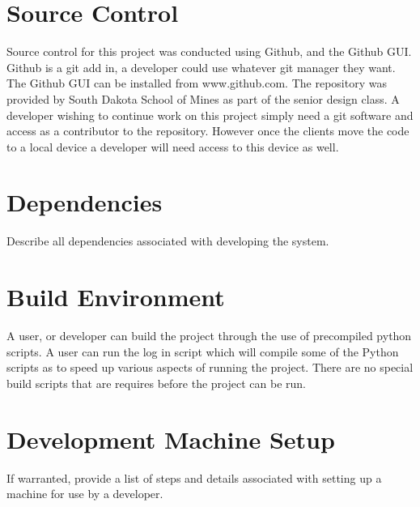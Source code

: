 \section{Source  Control}
Source control for this project was conducted using Github, and the Github GUI. Github is a git add in, a developer  
could use whatever git manager they want. The Github GUI can be installed from www.github.com. The repository was provided by South Dakota School of Mines as part of the senior design class. A developer wishing to continue work on this project simply need a git software and access as a contributor to the repository. However once the clients move the code to a local device a developer will need access to this device as well.
 
\section{Dependencies}
Describe all dependencies associated with developing the system. 

\section{Build  Environment}
A user, or developer can build the project through the use of precompiled python scripts. A user can run the log in script which will compile some of the Python scripts as to speed up various aspects of running the project. There are no special build scripts that are requires before the project can be run.

\section{Development Machine Setup}
If warranted, provide a list of steps and details associated with setting up a 
machine for use by a developer. 


